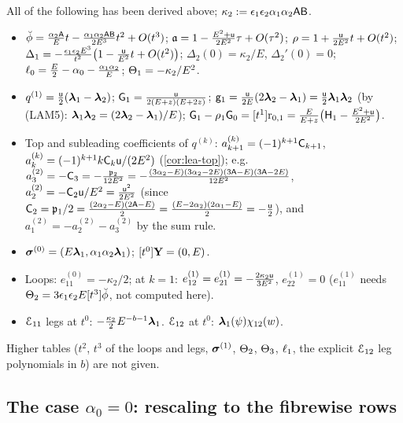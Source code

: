 \begin{rmk}
\label{rmk:lea-low}
All of the following has been derived above; $\kappa_2 := \epsilon_1\epsilon_2\alpha_1\alpha_2\mathsf{A}\mathsf{B}$.
\begin{itemize}
\item $\breve{\phi} = \frac{\alpha_2\mathsf{A}}{E}t - \frac{\alpha_1\alpha_2\mathsf{A}\mathsf{B}}{2E^3}t^2 + O(t^3)$; $\mathfrak{a} = 1 - \frac{E^2+\mathsf{u}}{2E^2}\tau + O(\tau^2)$; $\rho = 1 + \frac{\mathsf{u}}{2E^2}t + O(t^2)$; $\Delta_1 = -\frac{\epsilon_1\epsilon_2E^3}{t^2}\bigl(1 - \frac{\mathsf{u}}{E^2}t + O(t^2)\bigr)$; $\Delta_2(0) = \kappa_2/E$, $\Delta_2'(0) = 0$; $\ell_0 = \frac{E}{2} - \alpha_0 - \frac{\alpha_1\alpha_2}{E}$; $\Theta_1 = -\kappa_2/E^2$.
\item $q^{(1)} = \frac{\mathsf{u}}{2}(\boldsymbol{\lambda}_1-\boldsymbol{\lambda}_2)$; $\mathsf{G}_1 = \frac{\mathsf{u}}{2(E+z)(E+2z)}$; $\mathsf{g}_1 = \frac{\mathsf{u}}{2E}(2\boldsymbol{\lambda}_2-\boldsymbol{\lambda}_1) = \frac{\mathsf{u}}{2}\boldsymbol{\lambda}_1\boldsymbol{\lambda}_2$ (by (LAM5): $\boldsymbol{\lambda}_1\boldsymbol{\lambda}_2 = (2\boldsymbol{\lambda}_2-\boldsymbol{\lambda}_1)/E$); $\mathsf{G}_1 - \rho_1\mathsf{G}_0 = [t^1]\mathrm{r}_{0,1} = \frac{E}{E+z}\bigl(\mathsf{H}_1 - \frac{E^2+\mathsf{u}}{2E^2}\bigr)$.
\item Top and subleading coefficients of $q^{(k)}$: $a_{k+1}^{(k)} = (-1)^{k+1}\mathsf{C}_{k+1}$, $a_k^{(k)} = (-1)^{k+1}k\mathsf{C}_k\mathsf{u}/(2E^2)$ (\cref{cor:lea-top}); e.g.\ $a_3^{(2)} = -\mathsf{C}_3 = -\frac{\mathfrak{p}_2}{12E^2} = -\frac{(3\alpha_2-E)(3\alpha_2-2E)(3\mathsf{A}-E)(3\mathsf{A}-2E)}{12E^2}$, $a_2^{(2)} = -\mathsf{C}_2\mathsf{u}/E^2 = \frac{\mathsf{u}^2}{2E^2}$ (since $\mathsf{C}_2 = \mathfrak{p}_1/2 = \frac{(2\alpha_2-E)(2\mathsf{A}-E)}{2} = \frac{(E-2\alpha_2)(2\alpha_1-E)}{2} = -\frac{\mathsf{u}}{2}$), and $a_1^{(2)} = -a_2^{(2)} - a_3^{(2)}$ by the sum rule.
\item $\boldsymbol{\sigma}^{(0)} = (E\boldsymbol{\lambda}_1,\alpha_1\alpha_2\boldsymbol{\lambda}_1)$; $[t^0]\mathbf{Y} = (0,E)$.
\item Loops: $e_{11}^{(0)} = -\kappa_2/2$; at $k = 1$: $e_{12}^{(1)} = e_{21}^{(1)} = -\frac{2\kappa_2\mathsf{u}}{3E^2}$, $e_{22}^{(1)} = 0$ ($e_{11}^{(1)}$ needs $\Theta_2 = 3\epsilon_1\epsilon_2E[t^3]\breve{\phi}$, not computed here).
\item $\mathcal{E}_{11}$ legs at $t^0$: $-\frac{\kappa_2}{2}E^{-b-1}\boldsymbol{\lambda}_1$. $\mathcal{E}_{12}$ at $t^0$: $\boldsymbol{\lambda}_1(\psi)\chi_{12}(w)$.
\end{itemize}
Higher tables ($t^2$, $t^3$ of the loops and legs, $\boldsymbol{\sigma}^{(1)}$, $\Theta_2$, $\Theta_3$, $\ell_1$, the explicit $\mathcal{E}_{12}$ leg polynomials in $b$) are not given.
\end{rmk}

\subsection{The case \texorpdfstring{$\alpha_0 = 0$}{alpha0 = 0}: rescaling to the fibrewise rows}
\label{sec:lea-a0}

